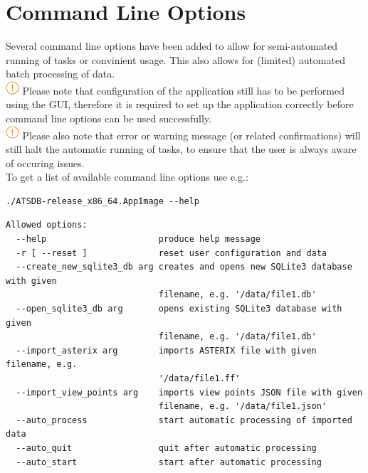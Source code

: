 \chapter{Command Line Options}
\label{sec:command_line} 

Several command line options have been added to allow for semi-automated running of tasks or convinient usage. This also allows for (limited) automated batch processing of data. \\

\includegraphics[width=0.5cm]{../../data/icons/hint.png} Please note that configuration of the application still has to be performed using the GUI, therefore it is required to set up the application correctly before command line options can be used successfully.\\

\includegraphics[width=0.5cm]{../../data/icons/hint.png} Please also note that error or warning message (or related confirmations) will still halt the automatic running of tasks, to ensure that the user is always aware of occuring issues. \\

To get a list of available command line options use e.g.:
\begin{lstlisting}
./ATSDB-release_x86_64.AppImage --help
\end{lstlisting}


\begin{lstlisting}
Allowed options:
  --help                      produce help message
  -r [ --reset ]              reset user configuration and data
  --create_new_sqlite3_db arg creates and opens new SQLite3 database with given
                              filename, e.g. '/data/file1.db'
  --open_sqlite3_db arg       opens existing SQLite3 database with given 
                              filename, e.g. '/data/file1.db'
  --import_asterix arg        imports ASTERIX file with given filename, e.g. 
                              '/data/file1.ff'
  --import_view_points arg    imports view points JSON file with given 
                              filename, e.g. '/data/file1.json'
  --auto_process              start automatic processing of imported data
  --auto_quit                 quit after automatic processing
  --auto_start                start after automatic processing
\end{lstlisting}
\ \\


